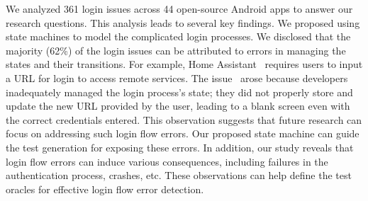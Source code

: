 We analyzed 361 login issues across 44 open-source Android apps to answer our research questions. 
This analysis leads to several key findings.
We proposed using state machines to model the complicated login processes. We disclosed that the majority (62\%) of the login issues can be attributed to errors in managing the states and their transitions.
For example, Home Assistant~\cite{home-assistant-android} requires users to input a URL for login to access remote services. The issue~\cite{HomeAssistantIssue} arose because developers inadequately managed the login process's state; they did not properly store and update the new URL provided by the user, leading to a blank screen even with the correct credentials entered. 
This observation suggests that future research can focus on addressing such login flow errors.
Our proposed state machine can guide the test generation for exposing these errors.
In addition, our study reveals that login flow errors can induce various consequences, including failures in the authentication process, crashes, etc.
These observations can help define the test oracles for effective login flow error detection.

